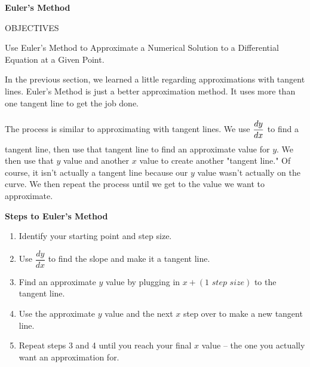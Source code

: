\bigskip

\textbf{\large{Euler's Method}} \par

\begin{tcolorbox}[objective]
    \begin{center}
        OBJECTIVES \\[11pt]
    \end{center}
    Use Euler's Method to Approximate a Numerical Solution to a Differential
    Equation at a Given Point. 
\end{tcolorbox}

In the previous section, we learned a little regarding approximations with tangent lines. Euler's Method is just a better approximation method. It uses more than one tangent line to get the job done. \par

The process is similar to approximating with tangent lines. We use $\dfrac{dy}{dx} \forcespace$ to find a tangent line, then use that tangent line to find an approximate value for $y$. We then use that $y$ value and another $x$ value to create another "tangent line." Of course, it isn't actually a tangent line because our $y$ value wasn't actually on the curve. We then repeat the process until we get to the value we want to approximate. \par

\textbf{Steps to Euler's Method}

\begin{enumerate}
    \item Identify your starting point and step size.
    \item Use $\dfrac{dy}{dx}$ to find the slope and make it a tangent line. 
    \item Find an approximate $y$ value by plugging in $x + (\textit{1 step size})$ to the tangent line.
    \item Use the approximate $y$ value and the next $x$ step over to make a new tangent line.
    \item Repeat steps 3 and 4 until you reach your final $x$ value -- the one you actually want an approximation for.
\end{enumerate}

